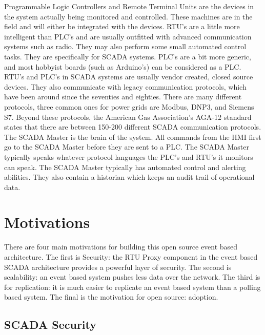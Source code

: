 \documentclass[11pt,a4paper,oldfontcommands]{memoir}
\begin{document}
Programmable Logic Controllers and Remote Terminal Units are the devices in the
system actually being monitored and controlled. These machines are in the field and will
either be integrated with the devices. RTU's are a little more intelligent
than PLC's and are usually outfitted with advanced communication systems such as radio.
They may also perform some small automated control tasks. They are specifically for 
SCADA systems. PLC's are a bit more generic, and most hobbyist boards (such as Arduino's)
can be considered as a PLC. RTU's and PLC's in SCADA systems are usually vendor 
created, closed source devices. They also communicate with legacy communication protocols, 
which have been around since the seventies and eighties. 
There are many different protocols,
three common ones for power grids are Modbus, DNP3, and Siemens S7. Beyond these protocols,
the American Gas Association's AGA-12 standard states that there are between 150-200
different SCADA communication protocols. \cite{Security issues in SCADA networks} \\

The SCADA Master is the brain of the system. All commands from the HMI first go to the
SCADA Master before they are sent to a PLC. The SCADA Master typically speaks whatever
protocol languages the PLC's and RTU's it monitors can speak. The SCADA Master typically
has automated control and alerting abilities. They also contain a historian which
keeps an audit trail of operational data. \cite{SCADA in the Light of Cyber Warfare}  \\

\section{Motivations}

\indent \indent
There are four main motivations for building this open source
event based architecture.
The first is Security: the RTU Proxy component in the event based SCADA architecture
provides a powerful layer of security. 
The second is scalability: an event based system pushes less
data over the network. The third is for replication: it is much easier to replicate
an event based system than a polling based system. The final is the motivation for
open source: adoption.

\subsection{SCADA Security}
\end{document}
